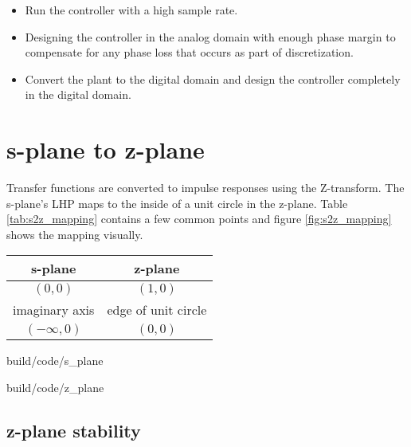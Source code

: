 \begin{itemize}
  \item Run the controller with a high sample rate.
  \item Designing the controller in the analog domain with enough
    \gls{phase margin} to compensate for any phase loss that occurs as part of
    \gls{discretization}.
  \item Convert the \gls{plant} to the digital domain and design the controller
    completely in the digital domain.
\end{itemize}

\section{s-plane to z-plane}

Transfer functions are converted to impulse responses using the Z-transform. The
s-plane's LHP maps to the inside of a unit circle in the z-plane. Table
\ref{tab:s2z_mapping} contains a few common points and figure
\ref{fig:s2z_mapping} shows the mapping visually.

\begin{booktable}
  \begin{tabular}{|cc|}
    \hline
    \rowcolor{headingbg}
    \textbf{s-plane} & \textbf{z-plane} \\
    \hline
    $(0, 0)$ & $(1, 0)$ \\
    imaginary axis & edge of unit circle \\
    $(-\infty, 0)$ & $(0, 0)$ \\
    \hline
  \end{tabular}
  \caption{Mapping from s-plane to z-plane}
  \label{tab:s2z_mapping}
\end{booktable}

\begin{bookfigure}
  \begin{minisvg}{build/code/s_plane}
  \end{minisvg}
  \hfill
  \begin{minisvg}{build/code/z_plane}
  \end{minisvg}
  \caption{Mapping of axes from s-plane (left) to z-plane (right)}
  \label{fig:s2z_mapping}
\end{bookfigure}

\subsection{z-plane stability}

